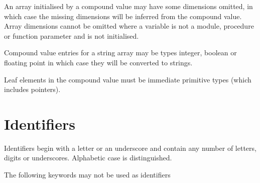         An array initialised by a compound value may have some dimensions
        omitted, in which case the missing dimensions will be inferred from the
        compound value. Array dimensions cannot be omitted where a variable is
        not a module, procedure or function parameter and is not initialised.
        
        Compound value entries for a string array may be types integer,
        boolean or floating point in which case they will be converted to strings.

        Leaf elements in the compound value must be immediate primitive
        types (which includes pointers).


    \section{Identifiers}

        Identifiers begin with a letter or an underscore and contain any
        number of letters, digits or underscores. Alphabetic case is
        distinguished.

        The following keywords may not be used as identifiers

